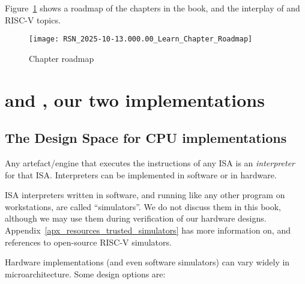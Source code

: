 \vspace{1ex}

Figure~\ref{Fig_Chapter_Roadmap} shows a roadmap of the chapters in
the book, and the interplay of {\BSV} and RISC-V topics.
\begin{figure}[htbp]
  \centerline{\texttt{[image: RSN\_2025-10-13.000.00\_Learn\_Chapter\_Roadmap]}}
  \caption{\label{Fig_Chapter_Roadmap}Chapter roadmap}
\end{figure}


\section{{\DRUM} and {\FIFE}, our two implementations}

\label{Sec_Drum_and_Fife}


\subsection{The Design Space for CPU implementations}

\label{Sec_Interpreters}

Any artefact/engine that executes the instructions of any ISA is an
\emph{interpreter} for that ISA.  Interpreters can be implemented in
software or in hardware.

ISA interpreters written in software, and running like any other
program on workstations, are called ``simulators''.  We do not discuss
them in this book, although we may use them during verification of our
hardware designs.  Appendix~\ref{apx_resources_trusted_simulators} has
more information on, and references to open-source RISC-V simulators.

Hardware implementations (and even software simulators) can vary
widely in microarchitecture.  Some design options are:

